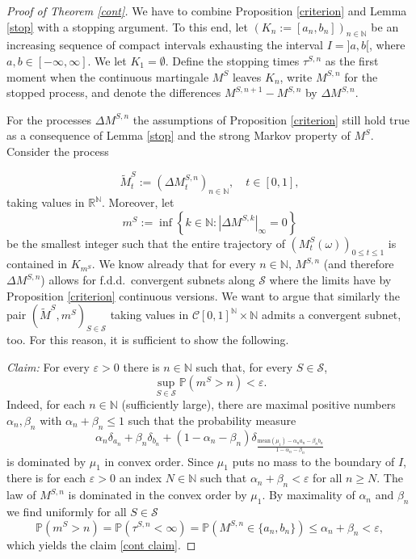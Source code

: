 \documentclass[11pt,a4paper]{article}%
\def\comment#1{\marginpar{\raggedright\scriptsize{\textcolor{purple}{#1}}}}
\def\R{{\mathbb R}}
\renewcommand{\epsilon}{\varepsilon}
\numberwithin{equation}{section}
\begin{document}
\begin{proof}[Proof of Theorem \ref{cont}]
	We have to combine Proposition \ref{criterion} and Lemma \ref{stop} with a stopping argument.
	To this end, let $(K_n := [a_n,b_n])_{n \in \mathbb N}$ be an increasing sequence of compact intervals exhausting the interval $I = ]a,b[$, where $a,b \in [-\infty, \infty]$. We let $K_1 = \emptyset$.
	Define the stopping times $\tau^{S,n}$ as the first moment when the continuous martingale $M^S$ leaves $K_n$, write $M^{S,n}$ for the stopped process, and denote the differences $M^{S,n+1} - M^{S,n}$ by $\Delta M^{S,n}$.
	

	For the processes $\Delta M^{S,n}$ the assumptions of Proposition \ref{criterion} still hold true as a consequence of Lemma \ref{stop} and the strong Markov property of $M^S$.
	Consider the process
	
	
	
	\[
		\tilde M^S_t := (\Delta M_t^{S,n})_{n \in \mathbb N}, \quad t \in [0,1],
	\]
	taking values in $\R^\mathbb N$.
	Moreover, let 
	\[
		m^S := \inf \left\{ k \in \mathbb N \colon \left\lvert \Delta M^{S,k} \right\rvert_\infty = 0 \right\}	
	\]
	be the smallest integer such that the entire trajectory of $(M^S_t(\omega))_{0 \le t \le 1}$ is contained in $K_{m^S}$.
	We know already that for every $n\in\mathbb N$, $M^{S,n}$ (and therefore $\Delta M^{S,n}$) allows for f.d.d.\ convergent subnets along $\mathcal S$ where the limits have by Proposition \ref{criterion} continuous versions.
	We want to argue that similarly the pair $(\tilde M^S,m^S)_{S\in\mathcal S}$ taking values in $\mathcal C[0,1]^\mathbb N \times \mathbb N$ admits a convergent subnet, too.
	For this reason, it is sufficient to show the following.

	\emph{Claim:} For every $\epsilon > 0$ there is $n \in \mathbb N$ such that, for every $ S \in \mathcal S$,
	\begin{equation} \label{cont claim}
		\sup_{S \in \mathcal S} \mathbb P\left( m^S > n \right) < \epsilon.
	\end{equation}
	 Indeed, for each $n\in \mathbb N$ (sufficiently large), there are maximal positive numbers $\alpha_n,\beta_n$ with $\alpha_n + \beta_n \le 1$ such that the probability measure
	\[
		\alpha_n \delta_{a_n} + \beta_n \delta_{b_n} + (1 - \alpha_n - \beta_n) \delta_{\frac{\text{mean}(\mu_1) - \alpha_n a_n - \beta_nb_n}{1 - \alpha_n - \beta_n}}
	\]
	is dominated by $\mu_1$ in convex order.
	Since $\mu_1$ puts no mass to the boundary of $I$, there is for each $\epsilon > 0$ an index $N \in \mathbb N$ such that $\alpha_n + \beta_n < \epsilon$ for all $n \ge N$.
	The law of $M^{S,n}$ is dominated in the convex order by $\mu_1$.
	By maximality of $\alpha_n$ and $\beta_n$ we find uniformly for all $S \in \mathcal S$
	\[
		\mathbb P\left( m^{S} > n \right) = \mathbb P\left( \tau^{S,n} < \infty \right) = \mathbb P\left( M^{S,n} \in \{a_n,b_n\} \right) \leq \alpha_n + \beta_n < \epsilon,
	\]
	which yields the claim \eqref{cont claim}.


\end{proof}
\end{document}
